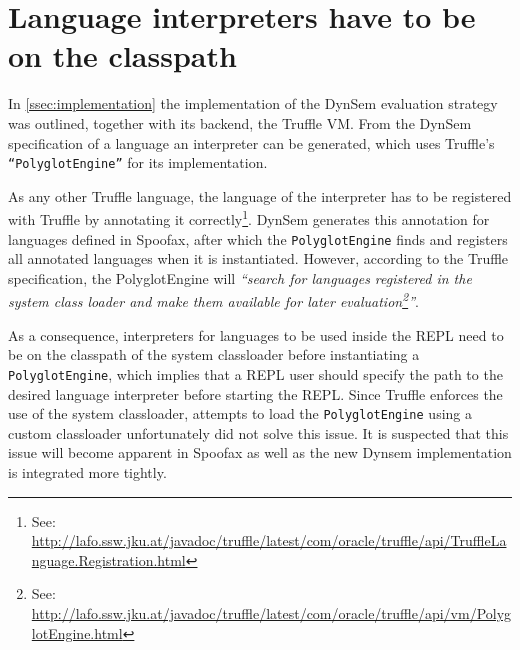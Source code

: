 \section{Language interpreters have to be on the classpath}
\label{sec:classpath}

In \cref{ssec:implementation} the implementation of the DynSem evaluation
strategy was outlined, together with its backend, the Truffle VM.
From the DynSem specification of a language an interpreter can be generated,
which uses Truffle's \texttt{``PolyglotEngine''} for its implementation.

As any other Truffle language, the language of the interpreter has to be
registered with Truffle by annotating it correctly\footnote{See:
\url{http://lafo.ssw.jku.at/javadoc/truffle/latest/com/oracle/truffle/api/TruffleLanguage.Registration.html}}.
DynSem generates this annotation for languages defined in Spoofax, after which
the \texttt{PolyglotEngine} finds and registers all annotated languages when it
is instantiated. However, according to the Truffle specification, the
PolyglotEngine will \textit{``search for languages registered in the system class
loader and make them available for later evaluation\footnote{See:
\url{http://lafo.ssw.jku.at/javadoc/truffle/latest/com/oracle/truffle/api/vm/PolyglotEngine.html}}''}.

As a consequence, interpreters for languages to be used inside the REPL need to
be on the classpath of the system classloader before instantiating a
\texttt{PolyglotEngine}, which implies that a REPL user should specify the path to
the desired language interpreter before starting the REPL. Since Truffle
enforces the use of the system classloader, attempts to load the
\texttt{PolyglotEngine} using a custom classloader unfortunately did not solve this
issue. It is suspected that this issue will become apparent in Spoofax as well as the new
Dynsem implementation is integrated more tightly.

